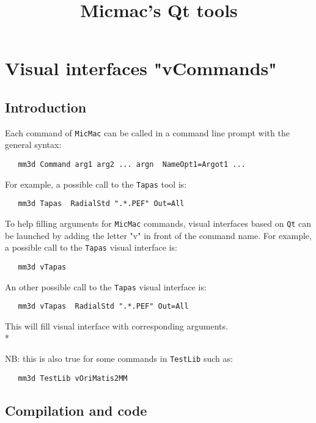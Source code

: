 \documentclass[a4paper]{book}
\begin{document}

\title{Micmac's Qt tools}

\maketitle

\section{Visual interfaces "vCommands"}
\subsection{Introduction}

Each command of {\tt MicMac} can be called in a command line prompt with the general syntax:

\begin{verbatim}
   mm3d Command arg1 arg2 ... argn  NameOpt1=Argot1 ...
\end{verbatim}

For example, a possible call to the {\tt Tapas} tool is:

\begin{verbatim}
   mm3d Tapas  RadialStd ".*.PEF" Out=All
\end{verbatim}

To help filling arguments for {\tt MicMac} commands, visual interfaces based on {\tt Qt} can be launched by adding the letter "v" in front of the command name. For example, a possible call to the {\tt Tapas} visual interface is:

\begin{verbatim}
   mm3d vTapas 
\end{verbatim}

An other possible call to the {\tt Tapas} visual interface is:

\begin{verbatim}
   mm3d vTapas  RadialStd ".*.PEF" Out=All
\end{verbatim}

This will fill visual interface with corresponding arguments.\\*

NB: this is also true for some commands in {\tt TestLib} such as:

\begin{verbatim}
   mm3d TestLib vOriMatis2MM
\end{verbatim}

\subsection{Compilation and code}
\end{document}
